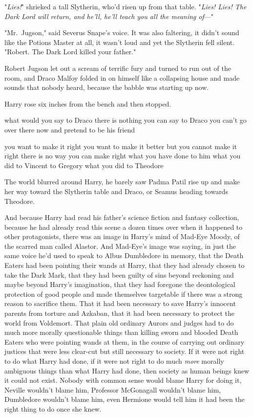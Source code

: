 "\emph{Lies!}" shrieked a tall Slytherin, who'd risen up from that table.
"\emph{Lies! Lies! The Dark Lord will return, and he'll, he'll teach you all
the meaning of}—"

"Mr.~Jugson," said Severus Snape's voice. It was also faltering, it didn't
sound like the Potions Master at all, it wasn't loud and yet the Slytherin fell
silent. "Robert. The Dark Lord killed your father."

Robert Jugson let out a scream of terrific fury and turned to run out of the
room, and Draco Malfoy folded in on himself like a collapsing house and made
sounds that nobody heard, because the babble was starting up now.

Harry rose six inches from the bench and then stopped.

what would you say to Draco there is nothing you can say to Draco you can't go
over there now and pretend to be his friend

you want to make it right you want to make it better but you cannot make it
right there is no way you can make right what you have done to him what you did
to Vincent to Gregory what you did to Theodore

The world blurred around Harry, he barely saw Padma Patil rise up and make her
way toward the Slytherin table and Draco, or Seamus heading towards Theodore.

And because Harry had read his father's science fiction and fantasy collection,
because he had already read this scene a dozen times over when it happened to
other protagonists, there was an image in Harry's mind of Mad-Eye Moody, of the
scarred man called Alastor. And Mad-Eye's image was saying, in just the same
voice he'd used to speak to Albus Dumbledore in memory, that the Death Eaters
had been pointing their wands at Harry, that they had already chosen to take
the Dark Mark, that they had been guilty of sins beyond reckoning and maybe
beyond Harry's imagination, that they had foregone the deontological protection
of good people and made themselves targetable if there was a strong reason to
sacrifice them. That it had been necessary to save Harry's innocent parents
from torture and Azkaban, that it had been necessary to protect the world from
Voldemort. That plain old ordinary Aurors and judges had to do much more
morally questionable things than killing sworn and blooded Death Eaters who
were pointing wands at them, in the course of carrying out ordinary justices
that were less clear-cut but still necessary to society. If it were not right
to do what Harry had done, if it were not right to do much \emph{more} morally
ambiguous things than what Harry had done, then society as human beings knew it
could not exist. Nobody with common sense would blame Harry for doing it,
Neville wouldn't blame him, Professor McGonagall wouldn't blame him, Dumbledore
wouldn't blame him, even Hermione would tell him it had been the right thing to
do once she knew.


